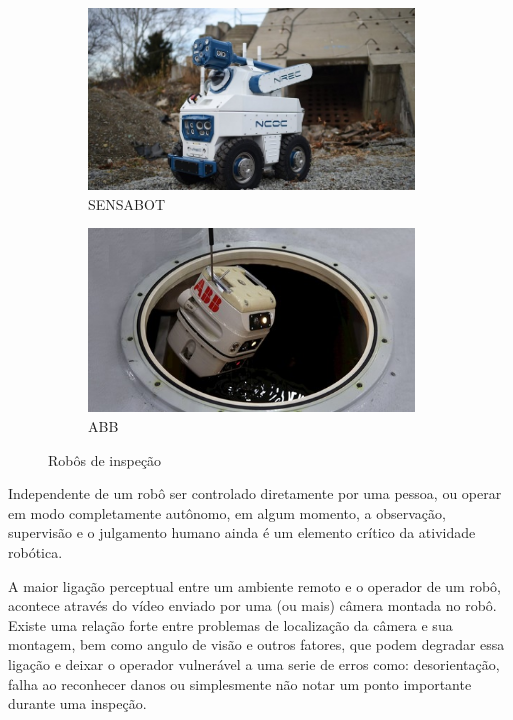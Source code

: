 \begin{figure}[H]
	\centering
	\begin{subfigure}{.5\textwidth}
		\includegraphics[width=0.95\textwidth]{figuras/sensabot.jpg}
		\caption{SENSABOT}
		\label{fig:sensabot}
	\end{subfigure}%
	\begin{subfigure}{.5\textwidth}
		\includegraphics[width=0.95\textwidth]{figuras/abb.jpg}
		\caption{ABB}
		\label{fig:abb}
	\end{subfigure}
	\caption{Robôs de inspeção}
\end{figure}

Independente de um robô ser controlado diretamente por uma pessoa, ou operar em modo completamente autônomo, em algum momento, a observação, supervisão e o julgamento humano ainda é um elemento crítico da atividade robótica.\par

A maior ligação perceptual entre um ambiente remoto e o operador de um robô, acontece através do vídeo enviado por uma (ou mais) câmera montada no robô. Existe uma relação forte entre problemas de localização da câmera e sua montagem, bem como angulo de visão e outros fatores, que podem degradar essa ligação e deixar o operador vulnerável a uma serie de erros como: desorientação, falha ao reconhecer danos ou simplesmente não notar um ponto importante durante uma inspeção.\par

